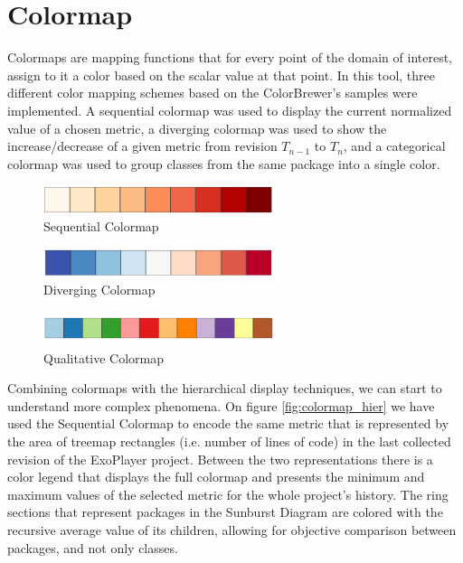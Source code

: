 \section{Colormap} \label{sec:colormap}
Colormaps are mapping functions that for every point of the domain of interest, assign to it a color based on the scalar value at that point. In this tool, three different color mapping schemes based on the ColorBrewer's \cite{ref:colorbrewer} samples were implemented. A sequential colormap was used to display the current normalized value of a chosen metric, a diverging colormap was used to show the increase/decrease of a given metric from revision $T_{n-1}$ to $T_{n}$, and a categorical colormap was used to group classes from the same package into a single color.

\begin{figure}[H]
	\centering
	\includegraphics[width=0.6\textwidth]{figures/seq.png}
	\caption{Sequential Colormap}
	\label{fig:seq}
\end{figure}

\begin{figure}[H]
	\centering
	\includegraphics[width=0.6\textwidth]{figures/div.png}
	\caption{Diverging Colormap}
	\label{fig:div}
\end{figure}

\begin{figure}[H]
	\centering
	\includegraphics[width=0.6\textwidth,height=1.0cm]{figures/quali.png}
	\caption{Qualitative Colormap}
	\label{fig:quali}
\end{figure}

Combining colormaps with the hierarchical display techniques, we can start to understand more complex phenomena. On figure \ref{fig:colormap_hier} we have used the Sequential Colormap to encode the same metric that is represented by the area of treemap rectangles (i.e. number of lines of code) in the last collected revision of the ExoPlayer project. Between the two representations there is a color legend that displays the full colormap and presents the minimum and maximum values of the selected metric for the whole project's history. The ring sections that represent packages in the Sunburst Diagram are colored with the recursive average value of its children, allowing for objective comparison between packages, and not only classes.

